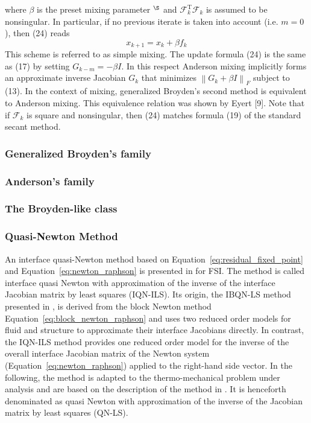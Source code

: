 where \(\beta\) is the preset mixing parameter \({ }^{\S}\) and \(\mathscr{F}_{k}^{\mathrm{T}} \mathscr{F}_{k}\) is assumed to be nonsingular. 
In particular, if no previous iterate is taken into account (i.e. \(m=0\) ), then (24) reads
\begin{equation}
  x_{k+1}=x_{k}+\beta f_{k}
\end{equation}
This scheme is referred to as simple mixing.
The update formula (24) is the same as (17) by setting \(G_{k-m}=-\beta I\). In this respect Anderson mixing implicitly forms an approximate inverse Jacobian \(G_{k}\) that minimizes \(\left\|G_{k}+\beta I\right\|_{F}\) subject to (13). In the context of mixing, generalized Broyden's second method is equivalent to Anderson mixing. This equivalence relation was shown by Eyert [9]. Note that if \(\mathscr{F}_{k}\) is square and nonsingular, then (24) matches formula (19) of the standard secant method.

\subsubsection{Generalized Broyden's family}

\subsubsection{Anderson's family}

\subsubsection{The Broyden-like class}

\subsubsection{Quasi-Newton Method}

An interface quasi-Newton method based on Equation~\eqref{eq:residual_fixed_point} and Equation~\eqref{eq:newton_raphson} is presented in \cite{degroote_joris_development_2010} for FSI.
The method is called interface quasi Newton with approximation of the inverse of the interface Jacobian matrix by least squares (IQN-ILS).
Its origin, the IBQN-LS method presented in \cite{vierendeels_implicit_2007}, is derived from the block Newton method Equation~\eqref{eq:block_newton_raphson} and uses two reduced order models for fluid and structure to approximate their interface Jacobians directly.
In contrast, the IQN-ILS method provides one reduced order model for the inverse of the overall interface Jacobian matrix of the Newton system (Equation~\eqref{eq:newton_raphson}) applied to the right-hand side vector.
In the following, the method is adapted to the thermo-mechanical problem under analysis and are based on the description of the method in \cite{gatzhammer_efficient_2014}.
It is henceforth denominated as quasi Newton with approximation of the inverse of the Jacobian matrix by least squares (QN-LS).

